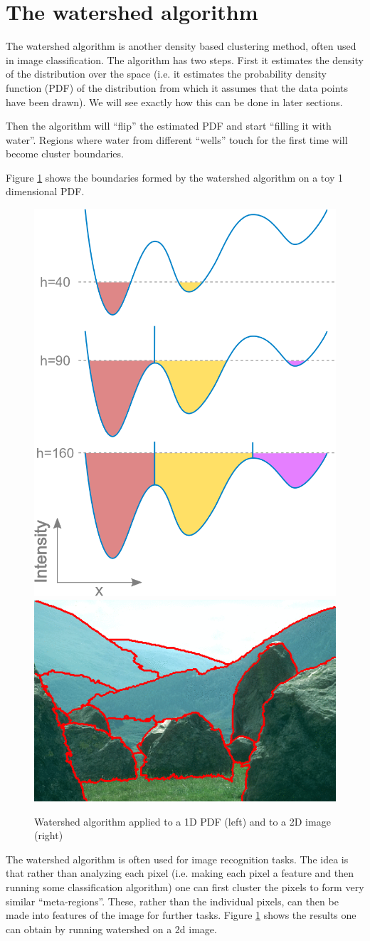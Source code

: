 \section{The watershed algorithm}
  The watershed algorithm is another density based clustering method, often used in image classification.
  The algorithm has two steps. First it estimates the density of the distribution over the space (i.e. 
  it estimates the probability density function (PDF) of the distribution from which it assumes that the data points
  have been drawn). We will see exactly how this can be done in later sections. 
  
  Then the algorithm will ``flip'' the estimated PDF and start ``filling it with water''. Regions where water from different
  ``wells'' touch for the first time will become cluster boundaries.
  
  Figure \ref{watershed} shows the boundaries formed by the watershed algorithm on a toy 1 dimensional PDF.
  
  \begin{figure}[h]
  \centering
  \includegraphics[width=.3\linewidth]{chapter_2/files/Watershed-flooding-graph.png}
  \includegraphics[width=.6\linewidth]{chapter_2/files/PW_overlay.png}
  \caption{Watershed algorithm applied to a 1D PDF (left) and to a 2D image (right) }
  \label{watershed}
  \end{figure}
  
  The watershed algorithm is often used for image recognition tasks. The idea is that rather than 
  analyzing each pixel (i.e. making each pixel a feature and then running some classification algorithm)
  one can first cluster the pixels to form very similar ``meta-regions''. These, rather than the individual pixels,
  can then be made into features of the image for further tasks. Figure \ref{watershed} shows the results one can
  obtain by running watershed on a 2d image.
  
